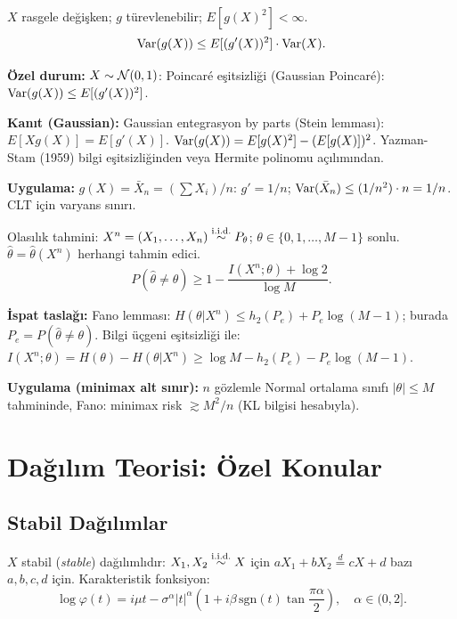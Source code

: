 \begin{ornek}
$X$ rasgele değişken; $g$ türevlenebilir; $E[g(X)^2]<\infty$.
\[
  \operatorname{Var}(g(X)) \leq E[(g'(X))^2]\cdot\operatorname{Var}(X).
\]

\textbf{Özel durum:} $X\sim\mathcal{N}(0,1)$: Poincaré eşitsizliği (Gaussian Poincaré):
$\operatorname{Var}(g(X))\leq E[(g'(X))^2]$.

\textbf{Kanıt (Gaussian):} Gaussian entegrasyon by parts (Stein lemması): $E[Xg(X)]=E[g'(X)]$.
$\operatorname{Var}(g(X))=E[g(X)^2]-(E[g(X)])^2$. Yazman-Stam (1959) bilgi eşitsizliğinden veya Hermite polinomu açılımından.

\textbf{Uygulama:} $g(X)=\bar X_n=(\sum X_i)/n$: $g'=1/n$; $\operatorname{Var}(\bar X_n)\leq (1/n^2)\cdot n=1/n$. CLT için varyans sınırı.
\end{ornek}

\begin{ornek}
Olasılık tahmini: $X^n=(X_1,\ldots,X_n)\overset{\text{i.i.d.}}{\sim} P_\theta$; $\theta\in\{0,1,\ldots,M-1\}$ sonlu. $\hat\theta=\hat\theta(X^n)$ herhangi tahmin edici.
\[
  P(\hat\theta\neq\theta) \geq 1 - \frac{I(X^n;\theta)+\log 2}{\log M}.
\]

\textbf{İspat taslağı:} Fano lemması: $H(\theta|X^n)\leq h_2(P_e)+P_e\log(M-1)$; burada $P_e=P(\hat\theta\neq\theta)$. Bilgi üçgeni eşitsizliği ile: $I(X^n;\theta)=H(\theta)-H(\theta|X^n)\geq\log M-h_2(P_e)-P_e\log(M-1)$.

\textbf{Uygulama (minimax alt sınır):} $n$ gözlemle Normal ortalama sınıfı $|\theta|\leq M$ tahmininde, Fano: minimax risk $\gtrsim M^2/n$ (KL bilgisi hesabıyla).
\end{ornek}

\section{Dağılım Teorisi: Özel Konular}
\label{app:ozel_dagilim}

\subsection{Stabil Dağılımlar}

\begin{tanim}\label{def:stabil}
$X$ stabil (\emph{stable}) dağılımlıdır: $X_1,X_2\overset{\text{i.i.d.}}{\sim} X$ için $aX_1+bX_2\overset{d}{=}cX+d$ bazı $a,b,c,d$ için. Karakteristik fonksiyon:
\[
  \log\varphi(t) = i\mu t - \sigma^\alpha|t|^\alpha\left(1+i\beta\,\mathrm{sgn}(t)\tan\frac{\pi\alpha}{2}\right), \quad \alpha\in(0,2].
\]
\end{tanim}

